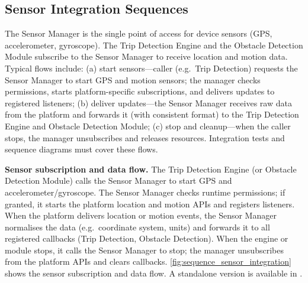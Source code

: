 \subsection{Sensor Integration Sequences}
\label{subsec:sensor_integration_sequences}%

The Sensor Manager is the single point of access for device sensors (GPS, accelerometer, gyroscope). The Trip Detection Engine and the Obstacle Detection Module subscribe to the Sensor Manager to receive location and motion data. Typical flows include: (a) start sensors---caller (e.g.\ Trip Detection) requests the Sensor Manager to start GPS and motion sensors; the manager checks permissions, starts platform-specific subscriptions, and delivers updates to registered listeners; (b) deliver updates---the Sensor Manager receives raw data from the platform and forwards it (with consistent format) to the Trip Detection Engine and Obstacle Detection Module; (c) stop and cleanup---when the caller stops, the manager unsubscribes and releases resources. Integration tests and sequence diagrams must cover these flows.

\textbf{Sensor subscription and data flow.} The Trip Detection Engine (or Obstacle Detection Module) calls the Sensor Manager to start GPS and accelerometer/gyroscope. The Sensor Manager checks runtime permissions; if granted, it starts the platform location and motion APIs and registers listeners. When the platform delivers location or motion events, the Sensor Manager normalises the data (e.g.\ coordinate system, units) and forwards it to all registered callbacks (Trip Detection, Obstacle Detection). When the engine or module stops, it calls the Sensor Manager to stop; the manager unsubscribes from the platform APIs and clears callbacks. \cref{fig:sequence_sensor_integration} shows the sensor subscription and data flow. A standalone version is available in .

